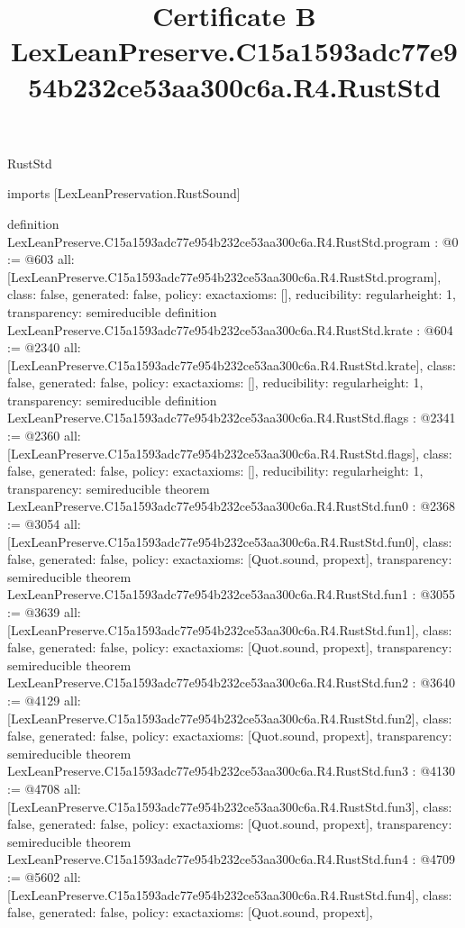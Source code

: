 \begin{lexlean}{RustStd}
\title{Certificate B LexLeanPreserve.C15a1593adc77e954b232ce53aa300c6a.R4.RustStd}
\begin{coremodule}
imports [LexLeanPreservation.RustSound]

definition LexLeanPreserve.C15a1593adc77e954b232ce53aa300c6a.R4.RustStd.program : @0 := @603 {
  all: [LexLeanPreserve.C15a1593adc77e954b232ce53aa300c6a.R4.RustStd.program],
  class: false,
  generated: false,
  policy: exact{axioms: []},
  reducibility: regular{height: 1},
  transparency: semireducible
}
definition LexLeanPreserve.C15a1593adc77e954b232ce53aa300c6a.R4.RustStd.krate : @604 := @2340 {
  all: [LexLeanPreserve.C15a1593adc77e954b232ce53aa300c6a.R4.RustStd.krate],
  class: false,
  generated: false,
  policy: exact{axioms: []},
  reducibility: regular{height: 1},
  transparency: semireducible
}
definition LexLeanPreserve.C15a1593adc77e954b232ce53aa300c6a.R4.RustStd.flags : @2341 := @2360 {
  all: [LexLeanPreserve.C15a1593adc77e954b232ce53aa300c6a.R4.RustStd.flags],
  class: false,
  generated: false,
  policy: exact{axioms: []},
  reducibility: regular{height: 1},
  transparency: semireducible
}
theorem LexLeanPreserve.C15a1593adc77e954b232ce53aa300c6a.R4.RustStd.fun0 : @2368 := @3054 {
  all: [LexLeanPreserve.C15a1593adc77e954b232ce53aa300c6a.R4.RustStd.fun0],
  class: false,
  generated: false,
  policy: exact{axioms: [Quot.sound, propext]},
  transparency: semireducible
}
theorem LexLeanPreserve.C15a1593adc77e954b232ce53aa300c6a.R4.RustStd.fun1 : @3055 := @3639 {
  all: [LexLeanPreserve.C15a1593adc77e954b232ce53aa300c6a.R4.RustStd.fun1],
  class: false,
  generated: false,
  policy: exact{axioms: [Quot.sound, propext]},
  transparency: semireducible
}
theorem LexLeanPreserve.C15a1593adc77e954b232ce53aa300c6a.R4.RustStd.fun2 : @3640 := @4129 {
  all: [LexLeanPreserve.C15a1593adc77e954b232ce53aa300c6a.R4.RustStd.fun2],
  class: false,
  generated: false,
  policy: exact{axioms: [Quot.sound, propext]},
  transparency: semireducible
}
theorem LexLeanPreserve.C15a1593adc77e954b232ce53aa300c6a.R4.RustStd.fun3 : @4130 := @4708 {
  all: [LexLeanPreserve.C15a1593adc77e954b232ce53aa300c6a.R4.RustStd.fun3],
  class: false,
  generated: false,
  policy: exact{axioms: [Quot.sound, propext]},
  transparency: semireducible
}
theorem LexLeanPreserve.C15a1593adc77e954b232ce53aa300c6a.R4.RustStd.fun4 : @4709 := @5602 {
  all: [LexLeanPreserve.C15a1593adc77e954b232ce53aa300c6a.R4.RustStd.fun4],
  class: false,
  generated: false,
  policy: exact{axioms: [Quot.sound, propext]},
}
\end{coremodule}
\end{lexlean}
